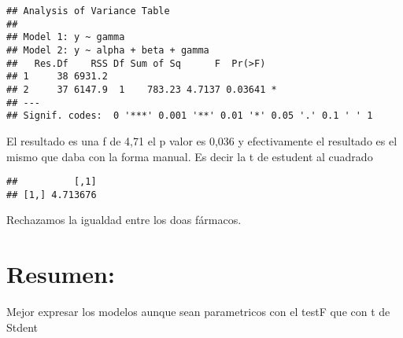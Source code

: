 \documentclass[
]{article}
\newenvironment{Shaded}{\begin{snugshade}}{\end{snugshade}}
\newcommand{\AttributeTok}[1]{\textcolor[rgb]{0.13,0.29,0.53}{#1}}
\newcommand{\CommentTok}[1]{\textcolor[rgb]{0.56,0.35,0.01}{\textit{#1}}}
\newcommand{\DecValTok}[1]{\textcolor[rgb]{0.00,0.00,0.81}{#1}}
\newcommand{\FunctionTok}[1]{\textcolor[rgb]{0.13,0.29,0.53}{\textbf{#1}}}
\newcommand{\NormalTok}[1]{#1}
\newcommand{\OtherTok}[1]{\textcolor[rgb]{0.56,0.35,0.01}{#1}}
\newcommand{\SpecialCharTok}[1]{\textcolor[rgb]{0.81,0.36,0.00}{\textbf{#1}}}
\begin{document}
\begin{verbatim}
## Analysis of Variance Table
## 
## Model 1: y ~ gamma
## Model 2: y ~ alpha + beta + gamma
##   Res.Df    RSS Df Sum of Sq      F  Pr(>F)  
## 1     38 6931.2                              
## 2     37 6147.9  1    783.23 4.7137 0.03641 *
## ---
## Signif. codes:  0 '***' 0.001 '**' 0.01 '*' 0.05 '.' 0.1 ' ' 1
\end{verbatim}

El resultado es una f de 4,71 el p valor es 0,036 y efectivamente el
resultado es el mismo que daba con la forma manual. Es decir la t de
estudent al cuadrado

\begin{Shaded}
\end{Shaded}

\begin{verbatim}
##          [,1]
## [1,] 4.713676
\end{verbatim}

Rechazamos la igualdad entre los doas fármacos.

\hypertarget{resumen}{%
\section{Resumen:}\label{resumen}}

Mejor expresar los modelos aunque sean parametricos con el testF que con
t de Stdent
\end{document}
